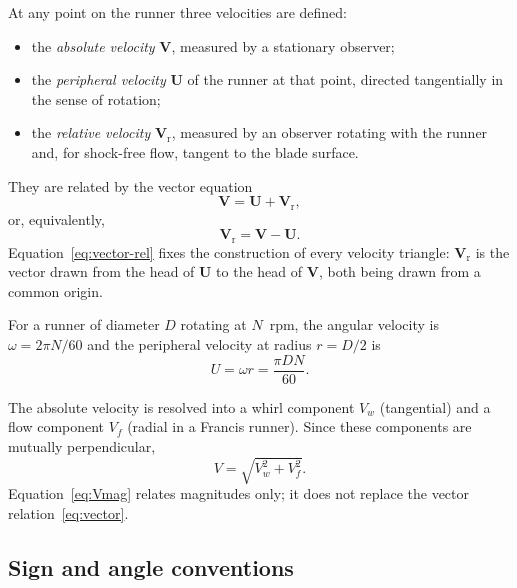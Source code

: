 \documentclass[11pt,a4paper]{article}
\numberwithin{equation}{section}
\newcommand{\vr}{\mathrm{r}}
\newcommand{\vvec}[1]{\bm{#1}}
\begin{document}
At any point on the runner three velocities are defined:
\begin{itemize}[nosep]
  \item the \emph{absolute velocity} $\vvec{V}$, measured by a stationary observer;
  \item the \emph{peripheral velocity} $\vvec{U}$ of the runner at that point, directed tangentially in the sense of rotation;
  \item the \emph{relative velocity} $\vvec{V}_\vr$, measured by an observer rotating with the runner and, for shock-free flow, tangent to the blade surface.
\end{itemize}
They are related by the vector equation
\begin{equation}
  \vvec{V} = \vvec{U} + \vvec{V}_\vr ,
  \label{eq:vector}
\end{equation}
or, equivalently,
\begin{equation}
  \vvec{V}_\vr = \vvec{V} - \vvec{U} .
  \label{eq:vector-rel}
\end{equation}
Equation~\eqref{eq:vector-rel} fixes the construction of every velocity triangle: $\vvec{V}_\vr$ is the vector drawn from the head of $\vvec{U}$ to the head of $\vvec{V}$, both being drawn from a common origin.

For a runner of diameter $D$ rotating at $N$~rpm, the angular velocity is $\omega = 2\pi N/60$ and the peripheral velocity at radius $r = D/2$ is
\begin{equation}
  U = \omega r = \frac{\pi D N}{60}.
  \label{eq:U}
\end{equation}

The absolute velocity is resolved into a whirl component $V_w$ (tangential) and a flow component $V_f$ (radial in a Francis runner). Since these components are mutually perpendicular,
\begin{equation}
  V = \sqrt{V_w^{2} + V_f^{2}} .
  \label{eq:Vmag}
\end{equation}
Equation~\eqref{eq:Vmag} relates magnitudes only; it does not replace the vector relation~\eqref{eq:vector}.

\subsection{Sign and angle conventions}
\label{sec:conventions}
\end{document}
